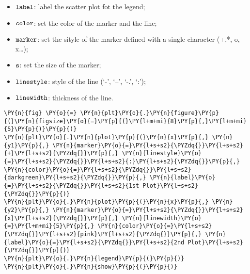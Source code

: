 \begin{itemize}
\tightlist
\item
  \(\tt{label}\): label the scatter plot fot the legend;
\item
  \(\tt{color}\): set the color of the marker and the line;
\item
  \(\tt{marker}\): set the sityle of the marker defined with a single
  character (+,*, o, x\ldots{});
\item
  \(\tt{s}\): set the size of the marker;
\item
  \(\tt{linestyle}\): style of the line (`-', `--', `-.', `:');
\item
  \(\tt{linewidth}\): thickness of the line.
\end{itemize}

    \begin{tcolorbox}[breakable, size=fbox, boxrule=1pt, pad at break*=1mm,colback=cellbackground, colframe=cellborder]
\begin{Verbatim}[commandchars=\\\{\}]
\PY{n}{fig} \PY{o}{=} \PY{n}{plt}\PY{o}{.}\PY{n}{figure}\PY{p}{(}\PY{n}{figsize}\PY{o}{=}\PY{p}{(}\PY{l+m+mi}{8}\PY{p}{,}\PY{l+m+mi}{5}\PY{p}{)}\PY{p}{)}
\PY{n}{plt}\PY{o}{.}\PY{n}{plot}\PY{p}{(}\PY{n}{x}\PY{p}{,} \PY{n}{y1}\PY{p}{,} \PY{n}{marker}\PY{o}{=}\PY{l+s+s2}{\PYZdq{}}\PY{l+s+s2}{+}\PY{l+s+s2}{\PYZdq{}}\PY{p}{,} \PY{n}{linestyle}\PY{o}{=}\PY{l+s+s2}{\PYZdq{}}\PY{l+s+s2}{:}\PY{l+s+s2}{\PYZdq{}}\PY{p}{,} \PY{n}{color}\PY{o}{=}\PY{l+s+s2}{\PYZdq{}}\PY{l+s+s2}{darkgreen}\PY{l+s+s2}{\PYZdq{}}\PY{p}{,} \PY{n}{label}\PY{o}{=}\PY{l+s+s2}{\PYZdq{}}\PY{l+s+s2}{1st Plot}\PY{l+s+s2}{\PYZdq{}}\PY{p}{)}
\PY{n}{plt}\PY{o}{.}\PY{n}{plot}\PY{p}{(}\PY{n}{x}\PY{p}{,} \PY{n}{y2}\PY{p}{,} \PY{n}{marker}\PY{o}{=}\PY{l+s+s2}{\PYZdq{}}\PY{l+s+s2}{x}\PY{l+s+s2}{\PYZdq{}}\PY{p}{,} \PY{n}{linewidth}\PY{o}{=}\PY{l+m+mi}{5}\PY{p}{,} \PY{n}{color}\PY{o}{=}\PY{l+s+s2}{\PYZdq{}}\PY{l+s+s2}{pink}\PY{l+s+s2}{\PYZdq{}}\PY{p}{,} \PY{n}{label}\PY{o}{=}\PY{l+s+s2}{\PYZdq{}}\PY{l+s+s2}{2nd Plot}\PY{l+s+s2}{\PYZdq{}}\PY{p}{)}
\PY{n}{plt}\PY{o}{.}\PY{n}{legend}\PY{p}{(}\PY{p}{)}
\PY{n}{plt}\PY{o}{.}\PY{n}{show}\PY{p}{(}\PY{p}{)}
\end{Verbatim}
\end{tcolorbox}

    \begin{center}
    \end{center}
    { \hspace*{\fill} \\}
    
